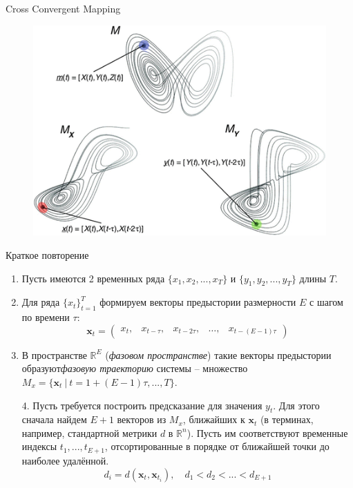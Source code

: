 \begin{frame}{Cross Convergent Mapping}
\begin{figure}
    \centering
    \includegraphics[width=\textwidth]{lecture_4/figs/CCM.png}
\end{figure}
\end{frame}
\begin{frame}{Краткое повторение}

\begin{enumerate}
    \item Пусть имеются 2 временных ряда $\{x_1, x_2,...,x_T\}$ и $\{y_1, y_2,...,y_T\}$ длины $T$.
    \item Для ряда $\{x_t\}_{t=1}^T$ формируем векторы предыстории размерности $E$ с шагом по времени $\tau$:
    $$ \mathbf{x}_t = \begin{pmatrix}
        x_t, & x_{t - \tau}, & x_{t - 2\tau}, & \dots, & x_{t - (E-1)\tau}
    \end{pmatrix}$$
    \item В пространстве $\mathbb{R}^E$ (\textit{фазовом пространстве}) такие векторы предыстории образуют\textit{фазовую траекторию} системы -- множество $M_x = \{\mathbf{x}_t \ | \ t = 1 + (E - 1)\tau, ..., T \}$.
    \item[4.] Пусть требуется построить предсказание для значения $y_t$. Для этого сначала найдем $E + 1$ векторов из $M_x$, ближайших к $\mathbf{x}_t$ (в терминах, например, стандартной метрики $d$ в $\mathbb{R}^n$). Пусть им соответствуют временные индексы $t_1, ..., t_{E+1}$, отсортированные в порядке от ближайшей точки до наиболее удалённой.
    $$ d_i = d(\mathbf{x}_t, \mathbf{x}_{t_i}), \quad d_1 < d_2 < ... < d_{E + 1}$$
\end{enumerate}

\end{frame}

